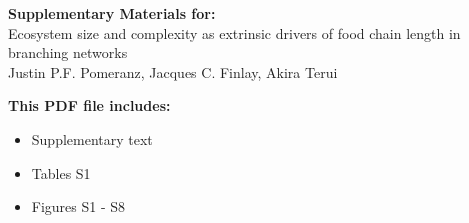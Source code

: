 \begin{center}
\vspace*{5mm}
\LARGE{\textbf{Supplementary Materials for:}}\\[7.5mm]
\LARGE{Ecosystem size and complexity as extrinsic drivers of food chain length in branching networks}\\[7.5mm]
\large{Justin P.F. Pomeranz, Jacques C. Finlay, Akira Terui}\\[7.5mm]
\end{center}
\begin{flushleft}
\textbf{This PDF file includes:}
\begin{itemize}
\item Supplementary text
\item Tables S1
\item Figures S1 - S8
\end{itemize}
\end{flushleft}

\newpage